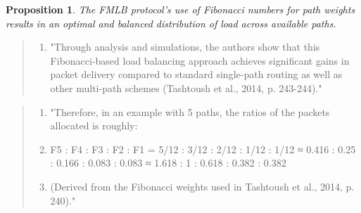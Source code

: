\documentclass{article}
\newtheorem{proposition}{Proposition}
\begin{document}
\begin{itemize}
    \begin{proposition}
        The FMLB protocol's use of Fibonacci numbers for path weights results in an optimal and balanced distribution of load across available paths.
    \end{proposition}
    \begin{quote}
        \begin{enumerate}[label=(\arabic*)]
            \item "Through analysis and simulations, the authors show that this Fibonacci-based load balancing approach achieves significant gains in packet delivery compared to standard single-path routing as well as other multi-path schemes (Tashtoush et al., 2014, p. 243-244)."
        \end{enumerate}
    \end{quote}
    \begin{quote}
        \begin{enumerate}[label=(\arabic*)]
            \item "Therefore, in an example with 5 paths, the ratios of the packets allocated is roughly:
            \item F5 : F4 : F3 : F2 : F1 = 5/12 : 3/12 : 2/12 : 1/12 : 1/12 ≈ 0.416 : 0.25 : 0.166 : 0.083 : 0.083 ≈ 1.618 : 1 : 0.618 : 0.382 : 0.382
            \item (Derived from the Fibonacci weights used in Tashtoush et al., 2014, p. 240)."
        \end{enumerate}
    \end{quote}
\end{itemize}
\end{document}
